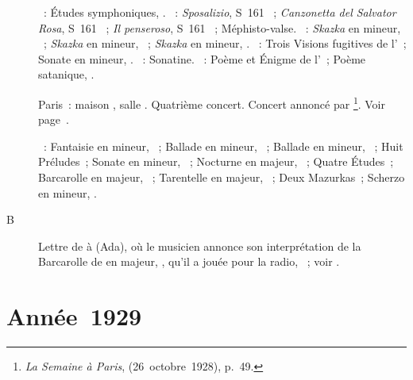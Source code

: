 \begin{description}
 \textsc{\Schumann{}}~: Études symphoniques, .
 \textsc{\Liszt{}}~: \emph{Sposalizio}, S~161 ~; \emph{Canzonetta
 del Salvator Rosa}, S~161 ~; \emph{Il penseroso}, S~161
 ~; Méphisto-valse.
 \textsc{\Medtner{}}~: \emph{Skazka} en \kF mineur,  ~;
 \emph{Skazka} en \kB \Flat mineur,  ~; \emph{Skazka} en
 \kB mineur,  .
 \textsc{\Prokofiev{}}~: Trois Visions fugitives de l'~; Sonate en
 \kA mineur, .
 \textsc{\Ravel{}}~: Sonatine.
 \textsc{\Scriabine{}}~: Poème et Énigme de l'~; Poème satanique,
 .
 \item[\DateWithWeekDay{1928-11-05}]
 Paris~: maison \Pleyel{}, salle \Chopin{}.
 Quatrième concert.
 Concert annoncé par \citeauthor{CarolBerard}%
 \footnote{\emph{La Semaine à Paris},  (26~octobre~1928),
 p.~49.}.
 Voir page~\pageref{rec:Paris4}.

 \textsc{\Chopin{}}~: Fantaisie en \kF mineur, ~; Ballade en \kG
 mineur, ~; Ballade en \kF mineur, ~; Huit Préludes~;
 Sonate en \kB mineur, ~; Nocturne en \kF majeur, 
 ~; Quatre Études~; Barcarolle en \kF \Sharp majeur, ~;
 Tarentelle en \kA \Flat majeur, ~; Deux Mazurkas~; Scherzo en \kB
 mineur, .
 \item[B\DateWithWeekDay{1928-11-08}]
 Lettre de \VSofronitsky{} à \AVizel{} (Ada), où le musicien annonce son
 interprétation de la Barcarolle de \Chopin{} en \kF \Sharp majeur,
 , qu'il a jouée pour la radio, ~; voir
 \citet[p.~150]{Nekrasova08}.
\end{description}

\section{Année~1929}

